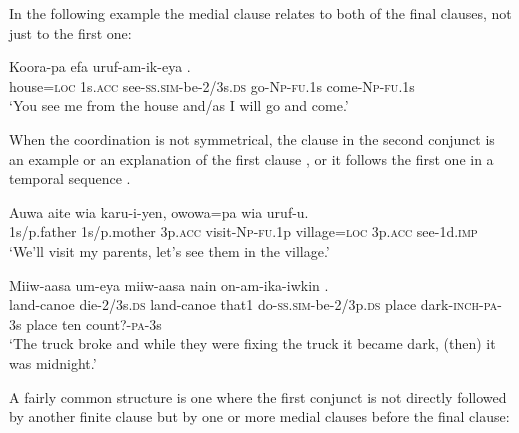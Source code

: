 In the following example the medial clause relates to both of the final clauses, not just to the first one:

\ea%
\label{ex:8:x1851}
\gll Koora-pa  efa  uruf-am-ik-eya  \textstyleEmphasizedVernacularWords{-}\textstyleEmphasizedVernacularWords{-} \textstyleEmphasizedVernacularWords{-}\textstyleEmphasizedVernacularWords{-}.\\
house=\textsc{loc}  1s.\textsc{acc}  see-\textsc{ss}.\textsc{sim}-be-2/3s.\textsc{ds}  go-\textsc{Np}-\textsc{fu}.1s come-\textsc{Np}-\textsc{fu}.1s\\
\glt `You see me from the house and/as I will go and come.'
\z
{}

When the coordination is not symmetrical, the clause in the second conjunct is an example or an explanation of the first clause , or it follows the first one in a temporal sequence .

\ea%
\label{ex:8:x1370}
\gll Auwa  aite  wia  karu-i-yen,  owowa=pa wia  uruf-u.\\
1s/p.father  1s/p.mother  3p.\textsc{acc}  visit-\textsc{Np}-\textsc{fu}.1p  village=\textsc{loc} 3p.\textsc{acc}  see-1d.\textsc{imp}\\
\glt `We'll visit my parents, let's see them in the village.'
\z


\ea%
\label{ex:8:x1369}
\gll Miiw-aasa  um-eya  miiw-aasa  nain  on-am-ika-iwkin          .
\\
land-canoe  die-2/3s.\textsc{ds}  land-canoe  that1  do-\textsc{ss}.\textsc{sim}-be-2/3p.\textsc{ds}      place  dark-\textsc{inch}-\textsc{pa}-3s  place  ten  count?-\textsc{pa}-3s\\
\glt `The truck broke and while they were fixing the truck it became dark, (then) it was midnight.'
\z

A fairly common structure is one where the first conjunct is not directly followed by another finite clause but by one or more medial clauses before the final clause:

